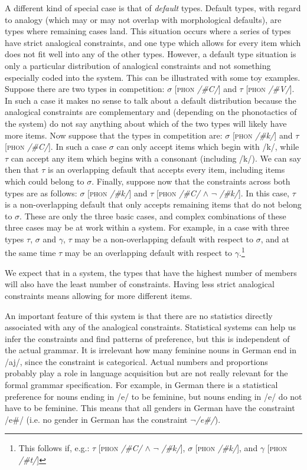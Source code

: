 A different kind of special case is that of \textit{default} types. Default types, with regard to analogy (which may or may not overlap with morphological defaults), are types where remaining cases land. This situation occurs where a series of types have strict analogical constraints, and one type which allows for every item which does not fit well into any of the other types. However, a default type situation is only a particular distribution of analogical constraints and not something especially coded into the system. This can be illustrated with some toy examples. Suppose there are two types in competition: $\sigma$ [\textsc{phon} \textit{/\#C/}] and $\tau$ [\textsc{phon} \textit{/\#V/}]. In such a case it makes no sense to talk about a default distribution because the analogical constraints are complementary and (depending on the phonotactics of the system) do not say anything about which of the two types will likely have more items. Now suppose that the types in competition are: $\sigma$ [\textsc{phon} \textit{/\#k/}] and $\tau$ [\textsc{phon} \textit{/\#C/}]. In such a case $\sigma$ can only accept items which begin with /k/, while $\tau$ can accept any item which begins with a consonant (including /k/). We can say then that $\tau$ is an overlapping default that accepts every item, including items which could belong to $\sigma$. Finally, suppose now that the constraints across both types are as follows: $\sigma$ [\textsc{phon} \textit{/\#k/}] and $\tau$ [\textsc{phon} \textit{/\#C/} $\land$ $\lnot$ \textit{/\#k/}]. In this case, $\tau$ is a non-overlapping default that only accepts remaining items that do not belong to $\sigma$. These are only the three basic cases, and complex combinations of these three cases may be at work within a system. For example, in a case with three types $\tau$, $\sigma$ and $\gamma$, $\tau$ may be a non-overlapping default with respect to $\sigma$, and at the same time $\tau$ may be an overlapping default with respect to $\gamma$.\footnote{This follows if, e.g.: $\tau$ [\textsc{phon} \textit{/\#C/} $\land$ $\lnot$ \textit{/\#k/}], $\sigma$ [\textsc{phon} \textit{/\#k/}], and $\gamma$ [\textsc{phon} \textit{/\#t/}]}

We expect that in a system, the types that have the highest number of members will also have the least number of constraints. Having less strict analogical constraints means allowing for more different items.

An important feature of this system is that there are no statistics directly associated with any of the analogical constraints. Statistical systems can help us infer the constraints and find patterns of preference, but this is independent of the actual grammar. It is irrelevant how many feminine nouns in German end in /aj/, since the constraint is categorical. Actual numbers and proportions probably play a role in language acquisition but are not really relevant for the formal grammar specification. For example, in German there is a statistical preference for nouns ending in /e/ to be feminine, but nouns ending in /e/ do not have to be feminine. This means that all genders in German have the constraint /e\#/ (i.e. no gender in German has the constraint \textit{$\lnot$/e\#/}).

